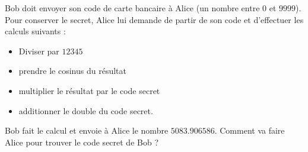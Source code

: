
\begin{exercice}\label{exo2smath-0257}

    Bob doit envoyer son code de carte bancaire à Alice (un nombre entre \( 0\) et \( 9999\)). Pour conserver le secret, Alice lui demande de partir de son code et d'effectuer les calculs suivants :
    \begin{itemize}
        \item Diviser par \( 12345\)
        \item prendre le cosinus du résultat
        \item multiplier le résultat par le code secret
        \item additionner le double du code secret.
    \end{itemize}
    Bob fait le calcul et envoie à Alice le nombre \( 5083.906586\). Comment va faire Alice pour trouver le code secret de Bob ?

\end{exercice}

